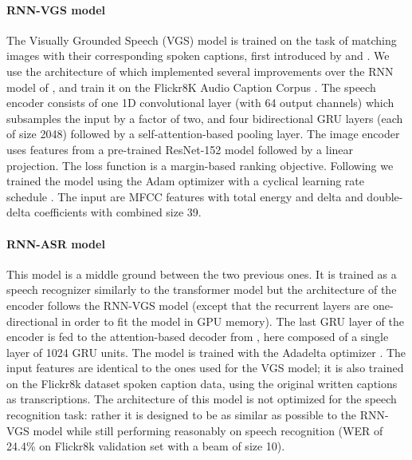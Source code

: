 \paragraph{RNN-VGS model}
\label{sec:rnn-vgs}

The Visually Grounded Speech (VGS) model is trained on the task of
matching images with their corresponding spoken captions, first introduced
by \citet{harwath2015deep} and \citet{harwath2016unsupervised}. We
use the architecture of \citet{Merkx2019} which implemented
several improvements over the RNN model of \citet{chrupala-etal-2017-representations},
and train it on the Flickr8K Audio Caption Corpus
\citep{harwath2015deep}.  The speech encoder consists of one
1D convolutional layer (with 64 output channels) which
subsamples the input by a factor of two, and four bidirectional GRU
layers (each of size 2048) followed by a self-attention-based pooling
layer. The image encoder uses features from a pre-trained ResNet-152
model \citep{he2016deep}
followed by a linear projection. The loss function is a margin-based
ranking objective. Following \citet{Merkx2019} we trained the model
using the Adam optimizer \citep{kingma2014adam} with a cyclical learning
rate schedule \citep{smith2017cyclical}. The
input are MFCC features with total energy and delta and double-delta
coefficients with combined size 39.

\paragraph{RNN-ASR model}
\label{sec:rnn-asr}

This model is a middle ground between the two previous ones. It is
trained as a speech recognizer similarly to the transformer model but
the architecture of the encoder follows the RNN-VGS model
(except that the recurrent layers are one-directional in order to fit
the model in GPU memory).  The last GRU layer of the encoder is fed to
the attention-based decoder from \citet{bahdanau_neural_2015}, here
composed of a single layer of 1024 GRU units. The model is trained
with the Adadelta optimizer \citep{zeiler_adadelta:_2012}. The input
features are identical to the ones used for the VGS model; it is also
trained on the Flickr8k dataset spoken caption data, using the
original written captions as transcriptions.  The architecture of this model is not
optimized for the speech recognition task: rather it is designed to be
as similar as possible to the RNN-VGS model while still performing
reasonably on speech recognition (WER of 24.4\% on Flickr8k validation set with a beam of size 10).

